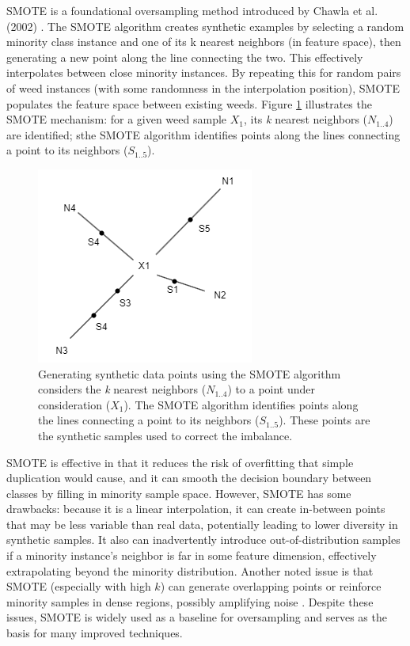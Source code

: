 \documentclass[agriengineering,article,submit,pdftex,moreauthors]{Definitions/mdpi}
\begin{document}
 SMOTE is a foundational oversampling method introduced by Chawla et al. (2002) \cite{Chawla2002-dk}. The SMOTE algorithm creates synthetic examples by selecting a random minority class instance and one of its k nearest neighbors (in feature space), then generating a new point along the line connecting the two. This effectively interpolates between close minority instances. By repeating this for random pairs of weed instances (with some randomness in the interpolation position), SMOTE populates the feature space between existing weeds. Figure \ref{fig:smote} illustrates the SMOTE mechanism: for a given weed sample $X_1$, its \textit{k} nearest neighbors ($N_{1..4}$) are identified; sthe SMOTE algorithm identifies points along the lines connecting a point to its neighbors ($S_{1..5}$).

\begin{figure}[H]
	\centering
	\includegraphics[scale=0.35]{./figures/smote.png}
	\caption[SMOTE selection of synthetic data points]{Generating synthetic data points using the SMOTE algorithm considers the \textit{k} nearest neighbors ($N_{1..4}$) to a point under consideration ($X_1$).  The SMOTE algorithm identifies points along the lines connecting a point to its neighbors ($S_{1..5}$). These points are the synthetic samples used to correct the imbalance.}
	\label{fig:smote}
\end{figure}
SMOTE is effective in that it reduces the risk of overfitting that simple duplication would cause, and it can smooth the decision boundary between classes by filling in minority sample space. However, SMOTE has some drawbacks: because it is a linear interpolation, it can create in-between points that may be less variable than real data, potentially leading to lower diversity in synthetic samples. It also can inadvertently introduce out-of-distribution samples if a minority instance’s neighbor is far in some feature dimension, effectively extrapolating beyond the minority distribution. Another noted issue is that SMOTE (especially with high $k$) can generate overlapping points or reinforce minority samples in dense regions, possibly amplifying noise \cite{Fernandez2018-fw}. Despite these issues, SMOTE is widely used as a baseline for oversampling and serves as the basis for many improved techniques.
%
\end{document}
